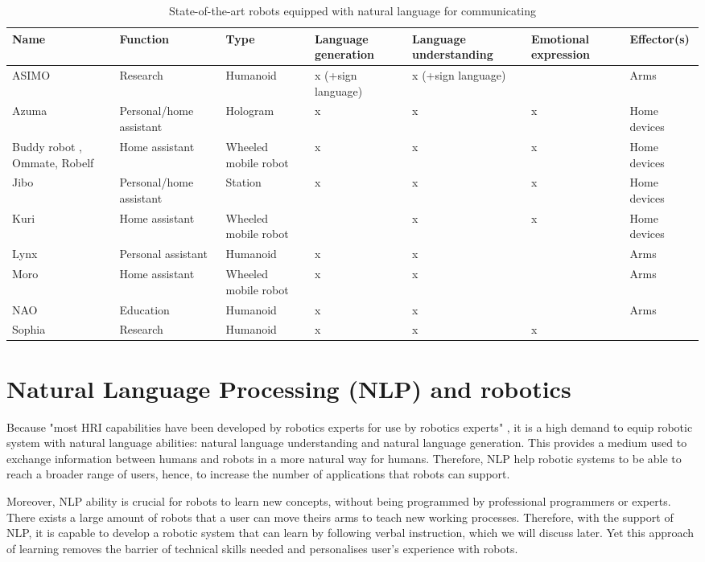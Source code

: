 \documentclass[10pt, a4paper]{article}
\begin{document}
\begin{table}[ht]
\begin{center}
\begin{tabular}{|p{2cm}|l|p{2cm}|p{1.5cm}|p{1.5cm}|p{1.5cm}|p{2cm}|}
\hline
Name&Function&Type&Language generation&Language understanding&Emotional expression&Effector(s)\\
\hline\hline
ASIMO&Research&Humanoid&x (+sign language)&x (+sign language)&&Arms\\
Azuma&Personal/home assistant&Hologram&x&x&x&Home devices\\
Buddy robot , Ommate, Robelf&Home assistant&Wheeled mobile robot&x&x&x&Home devices\\
Jibo&Personal/home assistant&Station&x&x&x&Home devices\\
Kuri&Home assistant&Wheeled mobile robot&&x&x&Home devices\\
Lynx&Personal assistant&Humanoid&x&x&&Arms\\
Moro&Home assistant&Wheeled mobile robot&x&x&&Arms\\
NAO&Education&Humanoid&x&x&&Arms\\
Sophia&Research&Humanoid&x&x&x&\\
\hline
\end{tabular}
\caption{State-of-the-art robots equipped with natural language for communicating}
\label{tab:table1}
\end{center}
\end{table}

\section{Natural Language Processing (NLP) and robotics}
Because "most HRI capabilities have been developed by robotics experts for use by robotics experts" \cite{scholtz2003theory}, it is a high demand to equip robotic system with natural language abilities: natural language understanding and natural language generation. This provides a medium used to exchange information between humans and robots in a more natural way for humans. Therefore, NLP help robotic systems to be able to reach a broader range of users, hence, to increase the number of applications that robots can support.

Moreover, NLP ability is crucial for robots to learn new concepts, without being programmed by professional programmers or experts. There exists a large amount of robots that a user can move theirs arms to teach new working processes. Therefore, with the support of NLP, it is capable to develop a robotic system that can learn by following verbal instruction, which we will discuss later. Yet this approach of learning removes the barrier of technical skills needed and personalises user's experience with robots.
\end{document}
